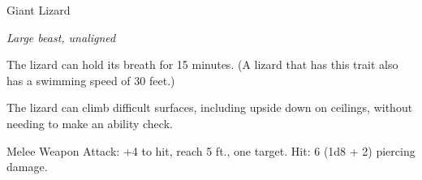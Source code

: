 \begin{monsterbox}{Giant Lizard}
\begin{hangingpar}
\textit{Large beast, unaligned}
\end{hangingpar}
\dndline%
\basics[%
armorclass = 12,
hitpoints = 3d10 + 3,
speed = {30 ft., climb 30 ft.}
]
\dndline%
\stats[%
STR = \stat{15},
DEX = \stat{12},
CON = \stat{13},
INT = \stat{2},
WIS = \stat{10},
CHA = \stat{5}
]
\dndline%
\details[%
skills={},
damageimmunities={},
savingthrows={},
conditionimmunities={},
damageresistances={},
damagevulnerabilities={},
senses={darkvision 30 ft., passive Perception 10},
challenge=1/4
]
\dndline%
\begin{monsteraction}
The lizard can hold its breath for 15 minutes. (A lizard that has this trait also has a swimming speed of 30 feet.)
\end{monsteraction}
\begin{monsteraction}
The lizard can climb difficult surfaces, including upside down on ceilings, without needing to make an ability check.
\end{monsteraction}
\begin{monsteraction}[Bite]
Melee Weapon Attack: +4 to hit, reach 5 ft., one target. Hit: 6 (1d8 + 2) piercing damage.
\end{monsteraction}
\end{monsterbox}